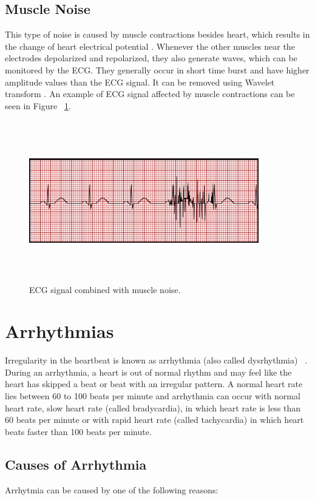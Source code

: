 \subsection{Muscle Noise}
This type of noise is caused by muscle contractions besides heart, which results in the change of heart electrical potential \cite{markovski2013ict}. Whenever the other muscles near the electrodes depolarized and repolarized, they also generate waves, which can be monitored by the ECG. They generally occur in short time burst and have higher amplitude values than the ECG signal. It can be removed using Wavelet transform \cite{6091791}. An example of ECG signal affected by muscle contractions can be seen in Figure ~\ref{fig:Tremor}.

\begin{figure}[htpb]
	\centering
	\includegraphics[width=10cm,height=7cm,keepaspectratio=true]{images/Tremor}
	\caption{
		ECG signal combined with muscle noise\cite{ecg_artifacts}.
	}
	\label{fig:Tremor}
\end{figure}

\section{Arrhythmias}
Irregularity in the heartbeat is known as arrhythmia (also called dysrhythmia) ~\cite{medicinenet}. During an arrhythmia, a heart is out of normal rhythm and may feel like the heart has skipped a beat or beat with an irregular pattern. A normal heart rate lies between 60 to 100 beats per minute and arrhythmia can occur with normal heart rate,  slow heart rate (called bradycardia), in which heart rate is less than 60 beats per minute or with rapid heart rate (called tachycardia) in which heart beats faster than 100 beats
per minute.



\subsection{Causes of Arrhythmia}
Arrhytmia can be caused by one of the following reasons:

